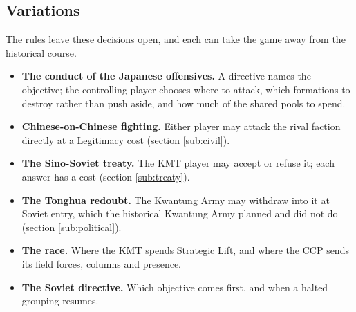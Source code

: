 \documentclass[11pt]{article}
\begin{document}
\subsection{Variations}\label{sub:variations}
The rules leave these decisions open, and each can take the game away from the historical course.
\begin{itemize}
\item \textbf{The conduct of the Japanese offensives.} A directive names the objective; the controlling player chooses where to attack, which formations to destroy rather than push aside, and how much of the shared pools to spend.
\item \textbf{Chinese-on-Chinese fighting.} Either player may attack the rival faction directly at a Legitimacy cost (section \ref{sub:civil}).
\item \textbf{The Sino-Soviet treaty.} The KMT player may accept or refuse it; each answer has a cost (section \ref{sub:treaty}).
\item \textbf{The Tonghua redoubt.} The Kwantung Army may withdraw into it at Soviet entry, which the historical Kwantung Army planned and did not do (section \ref{sub:political}).
\item \textbf{The race.} Where the KMT spends Strategic Lift, and where the CCP sends its field forces, columns and presence.
\item \textbf{The Soviet directive.} Which objective comes first, and when a halted grouping resumes.
\end{itemize}
\end{document}
